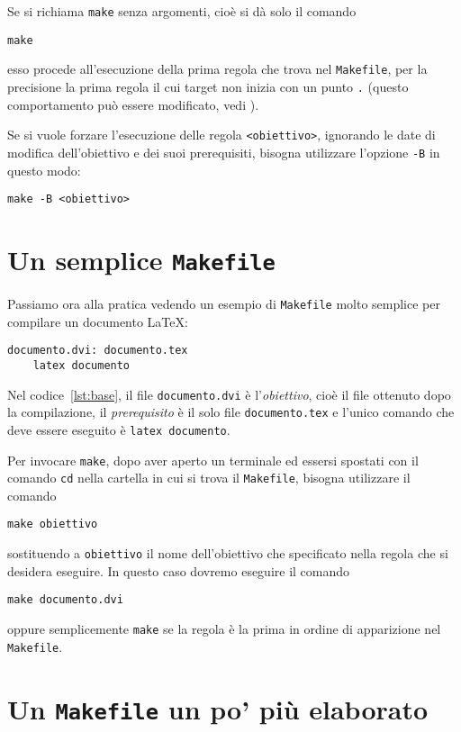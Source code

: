 Se si richiama \verb|make| senza argomenti, cioè si dà solo il comando
\begin{verbatim}
make
\end{verbatim}
esso procede all'esecuzione della prima regola che trova nel \verb|Makefile|,
per la precisione la prima regola il cui target non inizia con un punto \verb|.|
(questo comportamento può essere modificato, vedi \textcite[5]{gnu:make}).

Se si vuole forzare l'esecuzione delle regola \verb|<obiettivo>|, ignorando le
date di modifica dell'obiettivo e dei suoi prerequisiti, bisogna utilizzare
l'opzione \texttt{-B} in questo modo:
\begin{verbatim}
make -B <obiettivo>
\end{verbatim}

\section{Un semplice \texttt{Makefile}}
\label{sec:makefile-semplice}

Passiamo ora alla pratica vedendo un esempio di \verb|Makefile| molto semplice
per compilare un documento \LaTeX{}:
\begin{lstlisting}[caption={Un semplice \texttt{Makefile}},label=lst:base,
showtabs=true,tab=\rightarrowfill]
documento.dvi: documento.tex
	latex documento
\end{lstlisting}
Nel codice~\ref{lst:base}, il file \verb|documento.dvi| è l'\emph{obiettivo},
cioè il file ottenuto dopo la compilazione, il \emph{prerequisito} è il solo
file \verb|documento.tex| e l'unico comando che deve essere eseguito è
\verb|latex documento|.

Per invocare \verb|make|, dopo aver aperto un terminale ed essersi spostati con
il comando \verb|cd| nella cartella in cui si trova il \verb|Makefile|, bisogna
utilizzare il comando
\begin{verbatim}
make obiettivo
\end{verbatim}
sostituendo a \verb|obiettivo| il nome dell'obiettivo che specificato nella
regola che si desidera eseguire.  In questo caso dovremo eseguire il comando
\begin{verbatim}
make documento.dvi
\end{verbatim}
oppure semplicemente \verb|make| se la regola è la prima in ordine di
apparizione nel \verb|Makefile|.


\section{Un \texttt{Makefile} un po' più elaborato}
\label{sec:makefile-elaborato}

